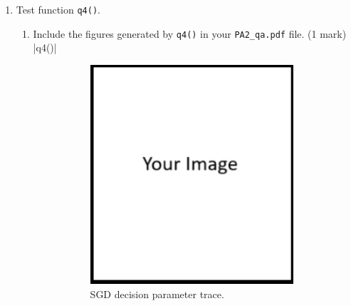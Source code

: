 \documentclass{article}
\theoremstyle{definition}
\newtheorem*{answer}{Answer}
\begin{document}
\begin{enumerate}[label=\ref{partsgd}.\alph*]
\begin{enumerate}[label=\ref{q11c}.\roman*]
\begin{figure}[h]
\begin{subfigure}[t]{0.5\textwidth}
					\caption{SGD Loss vs. iteration.}
				\end{subfigure}
				\caption{Figures generated by .}
			\end{figure}
		\item In 1-2 sentences describe the behavior of SGD in \verb|q3()| when $\eta=0.001, 0.005$, and $0.01$. Explain why SGD fails to find the global optimum point? (1 mark)
		\begin{answer}
			Your answer ...
		\end{answer}
		\item In 1-2 sentences describe the behavior of SGD in \verb|q3()| when $\eta=0.05$. (1 mark)
		\begin{answer}
			Your answer ...
		\end{answer}
	\end{enumerate}
	\newpage
	\item \label{q11d}Test function \verb|q4()|.
	\begin{enumerate}[label=\ref{q11d}.\roman*]
		\item Include the figures generated by \verb|q4()| in your \verb|PA2_qa.pdf| file. (1 mark)
		|q4()|
		\begin{figure}[h]
			\centering
			\begin{subfigure}[t]{0.5\textwidth}
				\centering
				\includegraphics[height=3.2in]{image.png}
				\caption{SGD decision parameter trace.}
			\end{subfigure}%
			~ 
			\begin{subfigure}[t]{0.5\textwidth}
				\centering

\end{subfigure}
\end{figure}
\end{enumerate}
\end{enumerate}
\end{document}

